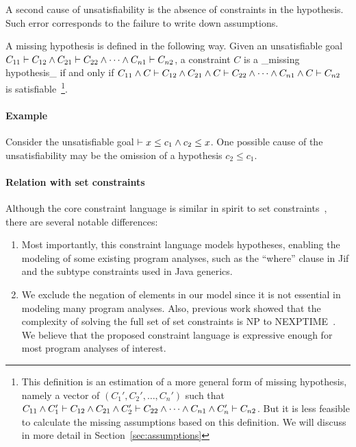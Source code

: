 A second cause of unsatisfiability is the absence of constraints in
the hypothesis. Such error corresponds to the failure to write down
assumptions.

A missing hypothesis is defined in the following way.
Given an unsatisfiable goal $C_{11} \vdash C_{12} \land C_{21} \vdash C_{22}
\land \dots \land C_{n1} \vdash C_{n2}$, a constraint $C$ is a _missing
hypothesis_ if and only if $C_{11} \land C \vdash C_{12} \land C_{21} \land C
\vdash C_{22} \land \dots \land C_{n1} \land C \vdash C_{n2}$ is
satisfiable~\footnote{This definition is an estimation of a more general form
of missing hypothesis, namely a vector of $(C_1', C_2', \dots, C_n')$ such that
$C_{11} \land C_1' \vdash C_{12} \land C_{21} \land C_2' \vdash C_{22} \land
\dots \land C_{n1} \land C_n' \vdash C_{n2}$. But it is less feasible to
calculate the missing assumptions based on this definition. We will discuss in
more detail in Section~\ref{sec:assumptions}}.

\paragraph{Example}
Consider the unsatisfiable goal $\vdash x \leq c_1 \land c_2 \leq x$.
One possible cause of the unsatisfiability may be the omission of a
hypothesis $c_2\leq c_1$.

\paragraph{Relation with set constraints}

Although the core constraint language is similar in spirit to set
constraints~\cite{aiken-setconstraint}, there are several notable
differences:

\begin{enumerate}

\item Most importantly, this constraint language models hypotheses,
enabling the modeling of some existing program analyses, such as the
``where'' clause in Jif and the subtype constraints used in Java
generics.

\item We exclude the negation of elements in our model since it is not
essential in modeling many program analyses. Also, previous work
showed that the complexity of solving the full set of set constraints
is NP to NEXPTIME~\cite{aiken-complexity}. We believe that the
proposed constraint language is expressive enough for most program
analyses of interest.

\end{enumerate}

